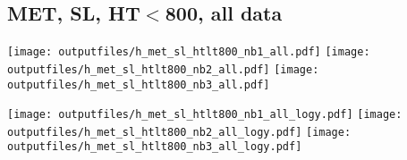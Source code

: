 \documentclass[11pt]{article}
\begin{document}








     \subsection{ MET, SL, HT$<$800, all data}

    \noindent
     \texttt{[image: outputfiles/h\_met\_sl\_htlt800\_nb1\_all.pdf]}
     \texttt{[image: outputfiles/h\_met\_sl\_htlt800\_nb2\_all.pdf]}
     \texttt{[image: outputfiles/h\_met\_sl\_htlt800\_nb3\_all.pdf]}

    \noindent
     \texttt{[image: outputfiles/h\_met\_sl\_htlt800\_nb1\_all\_logy.pdf]}
     \texttt{[image: outputfiles/h\_met\_sl\_htlt800\_nb2\_all\_logy.pdf]}
     \texttt{[image: outputfiles/h\_met\_sl\_htlt800\_nb3\_all\_logy.pdf]}
\end{document}
